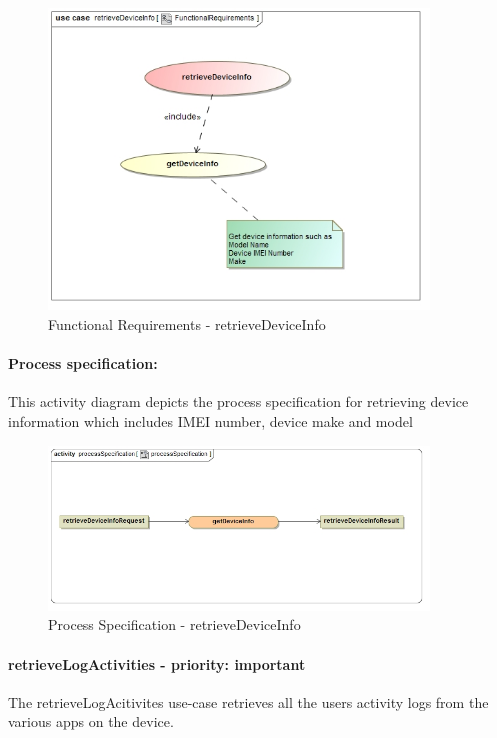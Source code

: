 \documentclass[hidelinks, 12pt, oneside]{article}
\begin{document}
		
		\begin{figure}[!htbp]
    		\centering
    		\includegraphics[width=0.9\textwidth]{img/functionalRequirementsRetrieveDeviceInfo.jpg}
    		\caption{Functional Requirements - retrieveDeviceInfo}
    		\label{fig:FunctionalReq_retrieveDeviceInfo}
		\end{figure}
		
		
		\paragraph{Process specification:}
		This activity diagram depicts the process specification for retrieving device information which includes IMEI number, device make and model
		
		\begin{figure}[!htbp]
    		\centering
    		\includegraphics[width=0.9\textwidth]{img/processSpecificationRetrieveDeviceInfo.jpg}
    		\caption{Process Specification - retrieveDeviceInfo}
    		\label{fig:ProcessSpec_retrieveDeviceInfo}
		\end{figure}
		
		
		\paragraph{retrieveLogActivities - priority: important}
		The retrieveLogAcitivites use-case retrieves all the users activity logs from the various apps on the device.\newpage
		
\end{document}
